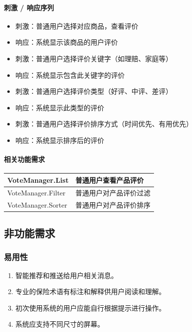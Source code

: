 \documentclass[a4paper]{ctexart}
\begin{document}
\paragraph{刺激 / 响应序列}

\begin{itemize}
    \item 刺激：普通用户选择对应商品，查看评价
    \item 响应：系统显示该商品的用户评价
    \item 刺激：普通用户选择评价关键字（如理赔、家庭等）
    \item 响应：系统显示包含此关键字的评价
    \item 刺激：普通用户选择评价类型（好评、中评、差评）
    \item 响应：系统显示此类型的评价
    \item 刺激：普通用户选择评价排序方式（时间优先、有用优先）
    \item 响应：系统显示排序后的评价
\end{itemize}

\paragraph{相关功能需求}

\begin{center}
  \begin{tabular}{p{6cm}|p{8cm}}
    \toprule
    VoteManager.List        & 普通用户查看产品评价 \\
    \midrule
    VoteManager.Filter        & 普通用户对产品评价过滤 \\
    \midrule
    VoteManager.Sorter        & 普通用户对产品评价排序 \\
    \bottomrule
  \end{tabular}
\end{center}



\subsection{非功能需求}

\subsubsection{易用性}

\begin{enumerate}[label=Usability\arabic*.]
  \item 智能推荐和推送给用户相关消息。
  \item 专业的保险术语有标注和解释供用户阅读和理解。
  \item 初次使用系统的用户应能自行根据提示进行操作。
  \item 系统应支持不同尺寸的屏幕。
\end{enumerate}
\end{document}
